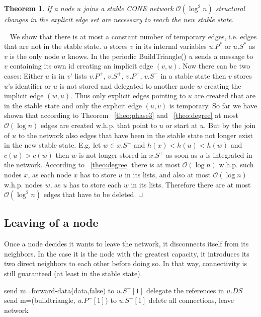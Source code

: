 \documentclass[11pt]{article}
\newtheorem{theorem}{Theorem}[section]
\newcommand{\sq}{\hbox{\rlap{$\sqcap$}$\sqcup$}}
\newcommand{\qed}{\hspace*{\fill}\sq}
\newenvironment{proof}{\noindent {\bf Proof.}\ }{\qed\par\vskip 4mm\par}
\begin{document}
\begin{theorem}
If a node $u$ joins a stable CONE network $\mathcal O(\log^2 n)$ structural changes in the explicit edge set are necessary to reach the new stable state.
\end{theorem}

\begin{proof}
We show that there is at most a constant number of temporary edges, i.e. edges that are not in the stable state.
$u$ stores $v$ in its internal variables $u.P^*$ or $u.S^*$ as $v$ is the only node $u$ knows. In the periodic BuildTriangle() $u$ sends a message to $v$ containing its own id creating an implicit edge $(v,u)$. Now there can be two cases: Either $u$ is in $v$' lists $v.P^+$, $v.S^+$, $v.P^-$, $v.S^-$ in a stable state then $v$ stores $u$'s identifier or $u$ is not stored and delegated to another node $w$ creating the implicit edge $(w,u)$. Thus only explicit edges pointing to $u$ are created that are in the stable state and only the explicit edge $(u,v)$ is temporary. So far we have shown that according to Theorem ~\ref{theo:phase3} and ~\ref{theo:degree} at most $\mathcal O(\log n)$ edges are created w.h.p. that point to $u$ or start at $u$. But by the join of $u$ to the network also edges that have been in the stable state not longer exist in the new stable state. E.g. let $w\in x.S^+$ and $h(x)<h(u)<h(w)$ and $c(u)>c(w)$ then $w$ is not longer stored in $x.S^+$ as soon as $u$ is integrated in the network. According to ~\ref{theo:degree} there is at most $\mathcal O(\log n)$ w.h.p. such nodes $x$, as each node $x$ has to store $u$ in its lists, and also at most $\mathcal O(\log n)$ w.h.p. nodes $w$, as $u$ has to store each $w$ in its lists. Therefore there are at most $\mathcal O(\log^2 n)$ edges that have to be deleted.
\end{proof}



\subsection{Leaving of a node}

Once a node decides it wants to leave the network, it disconnects itself from its neighbors. In the case it is the node with the greatest capacity, it introduces its two direct neighbors to each other before doing so. In that way, connectivity is still guaranteed (at least in the stable state).

\begin{algorithm}
\begin{algorithmic}
\State  send m=forward-data(data,false) to $u.S^-[1]$
\State delegate the references in $u.DS$
\EndFor
{}
\State send m=(buildtriangle, $u.P^-[1]$) to $u.S^-[1]$
\EndIf
\State delete all connections, leave network
\EndFunction
\end{algorithmic}
\end{algorithm}
\end{document}
